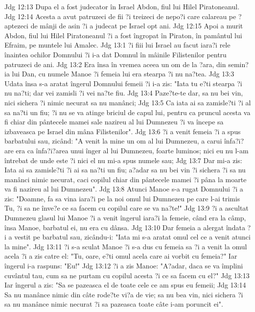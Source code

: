 Jdg 12:13  Dupa el a fost judecator în Israel Abdon, fiul lui Hilel Piratoneanul.
Jdg 12:14  Acesta a avut patruzeci de fii ?i treizeci de nepo?i care calareau pe ?aptezeci de mânji de asin ?i a judecat pe Israel opt ani.
Jdg 12:15  Apoi a murit Abdon, fiul lui Hilel Piratoneanul ?i a fost îngropat în Piraton, în pamântul lui Efraim, pe muntele lui Amalec.
Jdg 13:1  ?i fiii lui Israel au facut iara?i rele înaintea ochilor Domnului ?i i-a dat Domnul în mâinile Filistenilor pentru patruzeci de ani.
Jdg 13:2  Era însa în vremea aceea un om de la ?ara, din semin?ia lui Dan, cu numele Manoe ?i femeia lui era stearpa ?i nu na?tea.
Jdg 13:3  Udata însa s-a aratat îngerul Domnului femeii ?i i-a zis: "Iata tu e?ti stearpa ?i nu na?ti; dar vei zamisli ?i vei na?te fiu.
Jdg 13:4  Paze?te-te dar, sa nu bei vin, nici sichera ?i nimic necurat sa nu manânci;
Jdg 13:5  Ca iata ai sa zamisle?ti ?i al sa na?ti un fiu; ?i nu se va atinge briciul de capul lui, pentru ca pruncul acesta va fi chiar din pântecele mamei sale nazireu al lui Dumnezeu ?i va începe sa izbaveasca pe Israel din mâna Filistenilor".
Jdg 13:6  ?i a venit femeia ?i a spus barbatului sau, zicând: "A venit la mine un om al lui Dumnezeu, a carui înfa?i?are era ca înfa?i?area unui înger al lui Dumnezeu, foarte luminos; nici eu nu l-am întrebat de unde este ?i nici el nu mi-a spus numele sau;
Jdg 13:7  Dar mi-a zis: Iata ai sa zamisle?ti ?i ai sa na?ti un fiu; a?adar sa nu bei vin ?i sichera ?i sa nu manânci nimic necurat, caci copilul chiar din pântecele mamei ?i pâna la moarte va fi nazireu al lui Dumnezeu".
Jdg 13:8  Atunci Manoe s-a rugat Domnului ?i a zis: "Doamne, fa sa vina iara?i pe la noi omul lui Dumnezeu pe care l-ai trimis Tu, ?i sa ne înve?e ce sa facem cu copilul care se va na?te!"
Jdg 13:9  ?i a ascultat Dumnezeu glasul lui Manoe ?i a venit îngerul iara?i la femeie, când era la câmp, însa Manoe, barbatul ei, nu era cu dânsa.
Jdg 13:10  Dar femeia a alergat îndata ?i a vestit pe barbatul sau, zicându-i: "Iata mi s-a aratat omul cel ce a venit atunci la mine".
Jdg 13:11  ?i s-a sculat Manoe ?i s-a dus cu femeia sa ?i a venit la omul acela ?i a zis catre el: "Tu, oare, e?ti omul acela care ai vorbit cu femeia?" Iar îngerul i-a raspuns: "Eu!"
Jdg 13:12  ?i a zis Manoe: "A?adar, daca se va împlini cuvântul tau, cum sa ne purtam cu copilul acesta ?i ce sa facem cu el?"
Jdg 13:13  Iar îngerul a zis: "Sa se pazeasca el de toate cele ce am spus eu femeii;
Jdg 13:14  Sa nu manânce nimic din câte rode?te vi?a de vie; sa nu bea vin, nici sichera ?i sa nu manânce nimic necurat ?i sa pazeasca toate câte i-am poruncit ei".
